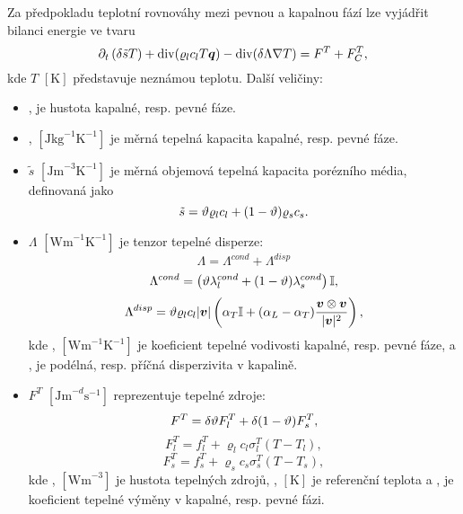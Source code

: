 
Za předpokladu teplotní rovnováhy mezi pevnou a kapalnou fází lze vyjádřit bilanci energie ve tvaru
\[
    \partial_t\left(\delta \tilde s T \right) + \div(\varrho_l c_l T \vc q) - \div(\delta\Lambda\nabla T) = F^T + F^T_C,
\]
kde $T$ $[\mathrm{K}]$ představuje neznámou teplotu.
Další veličiny:
\begin{itemize}
\item {},   je hustota kapalné, resp. pevné fáze.
\item {},  $[\mathrm{J}\mathrm{kg}^{-1}\mathrm{K}^{-1}]$ je měrná tepelná kapacita kapalné, resp. pevné fáze.
\item $\tilde s$ $[\mathrm{Jm}^{-3}\mathrm{K}^{-1}]$ je měrná objemová tepelná kapacita porézního média, definovaná jako
\[ \tilde s = \hyperA{HeatTransfer-DG-Data::porosity}{\th}\varrho_l c_l + (1-\th)\varrho_s c_s. \]
\item $\Lambda$ $[\mathrm{Wm}^{-1}\mathrm{K}^{-1}]$ je tenzor tepelné disperze:
\[ \Lambda = \Lambda^{cond} + \Lambda^{disp} \]
\[ \Lambda^{cond} = \left(\th \lambda_l^{cond} + (1-\th)\lambda_s^{cond}\right)\tn I, \]
\[ \Lambda^{disp} = \th \varrho_l c_l|\vc v|\left(\alpha_T\tn I + (\alpha_L-\alpha_T)\frac{\vc v\otimes\vc v}{|\vc v|^2}\right), \]
kde ,  $[\mathrm{Wm}^{-1}\mathrm{K}^{-1}]$ je koeficient tepelné vodivosti kapalné, resp. pevné fáze, a ,   je podélná, resp. příčná disperzivita v kapalině.

\item $F^T$ $[\mathrm{Jm}^{-d}\mathrm{s}^{-1}]$ reprezentuje tepelné zdroje:
\[ F^T = \delta \th F^T_l + \delta (1-\th) F^T_s, \]
\[ F^T_l = f_l^T + \varrho_l c_l \sigma^T_l(T-T_l), \]
\[ F^T_s = f_s^T + \varrho_s c_s \sigma^T_s(T-T_s), \]
kde ,  $[\mathrm{Wm}^{-3}]$ je hustota tepelných zdrojů, ,  $[\mathrm{K}]$ je referenční teplota a ,   je koeficient tepelné výměny v kapalné, resp. pevné fázi.
\end{itemize}



